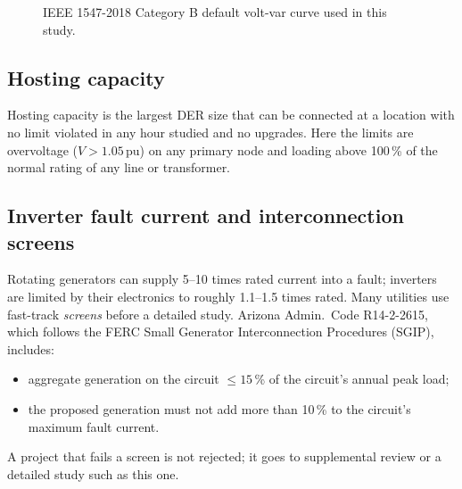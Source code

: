 \documentclass[11pt,letterpaper]{article}
\begin{document}
\begin{figure}[H]
\centering
{}
\caption{IEEE 1547-2018 Category B default volt-var curve used in this study.}
\label{fig:vvcurve}
\end{figure}

\subsection{Hosting capacity}
Hosting capacity is the largest DER size that can be connected at a location with no limit violated in any
hour studied and no upgrades. Here the limits are overvoltage ($V>1.05$\,pu) on any primary node and loading
above 100\,\% of the normal rating of any line or transformer.

\subsection{Inverter fault current and interconnection screens}
Rotating generators can supply 5--10 times rated current into a fault; inverters are limited by their
electronics to roughly 1.1--1.5 times rated. Many utilities use fast-track \emph{screens} before a detailed
study. Arizona Admin.\ Code R14-2-2615, which follows the FERC Small Generator Interconnection Procedures
(SGIP), includes:
\begin{itemize}
  \item aggregate generation on the circuit $\le 15$\,\% of the circuit's annual peak load;
  \item the proposed generation must not add more than 10\,\% to the circuit's maximum fault current.
\end{itemize}
A project that fails a screen is not rejected; it goes to supplemental review or a detailed study such as
this one.
\end{document}

